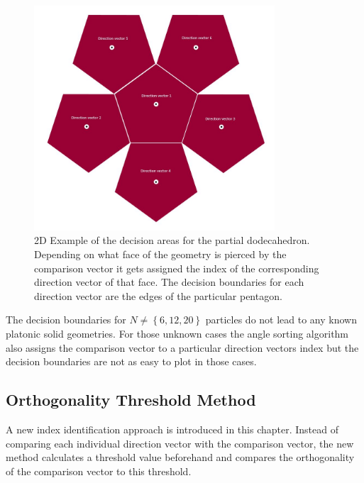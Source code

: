 \begin{figure}[H]
    \centering
    \includegraphics[width=0.8\textwidth]{Graphics/decision_area_normal.jpg}
    \caption{2D Example of the decision areas for the partial dodecahedron. Depending on what face of the geometry is pierced by the comparison vector it gets assigned the index of the corresponding direction vector of that face. The decision boundaries for each direction vector are the edges of the particular pentagon.}
    \label{decision_area_dodeca}
\end{figure}

The decision boundaries for $N \neq \left \{ 6,12,20 \right \}$ particles do not lead to any known platonic solid geometries. For those unknown cases the angle sorting algorithm also assigns the comparison vector to a particular direction vectors index but the decision boundaries are not as easy to plot in those cases.














\subsection{Orthogonality Threshold Method}
\label{chap:ortho_threshold}

A new index identification approach is introduced in this chapter. Instead of comparing each individual direction vector with the  comparison vector, the new method calculates a threshold value beforehand and compares the orthogonality of the comparison vector to this threshold.






